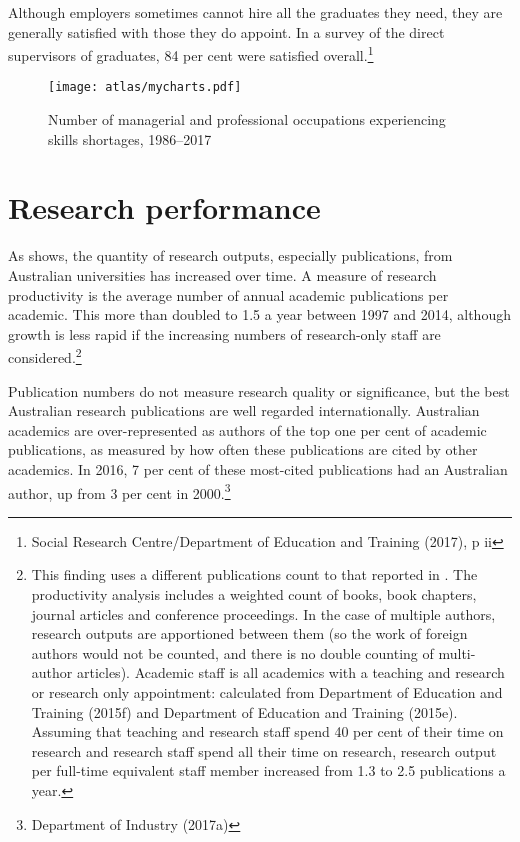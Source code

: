 \documentclass{grattan}
\begin{document}
Although employers sometimes cannot hire all the graduates they need, they are generally satisfied with those they do appoint. In a survey of the direct supervisors of graduates, 84 per cent were satisfied overall.\footnote{Social Research Centre/Department of Education and Training (2017), p ii}

    \begin{figure} %
    \caption{Number of managerial and professional occupations experiencing skills shortages, 1986--2017}\label{fig:number-of-managerial-and-professional-occupations-experiencing-skills-shortages-19862017}
    \units{}
    \texttt{[image: atlas/mycharts.pdf]}
    \end{figure}
%
\section{Research performance}\label{sec:research-performance}

As  shows, the quantity of research outputs, especially publications, from Australian universities has increased over time. A measure of research productivity is the average number of annual academic publications per academic. This more than doubled to 1.5 a year between 1997 and 2014, although growth is less rapid if the increasing numbers of research-only staff are considered.\footnote{This finding uses a different publications count to that reported in . The productivity analysis includes a weighted count of books, book chapters, journal articles and conference proceedings. In the case of multiple authors, research outputs are apportioned between them (so the work of foreign authors would not be counted, and there is no double counting of multi-author articles). Academic staff is all academics with a teaching and research or research only appointment: calculated from Department of Education and Training (2015f) and Department of Education and Training (2015e). Assuming that teaching and research staff spend 40 per cent of their time on research and research staff spend all their time on research, research output per full-time equivalent staff member increased from 1.3 to 2.5 publications a year.}

Publication numbers do not measure research quality or significance, but the best Australian research publications are well regarded internationally. Australian academics are over-represented as authors of the top one per cent of academic publications, as measured by how often these publications are cited by other academics. In 2016, 7 per cent of these most-cited publications had an Australian author, up from 3 per cent in 2000.\footnote{Department of Industry (2017a)}
\end{document}

